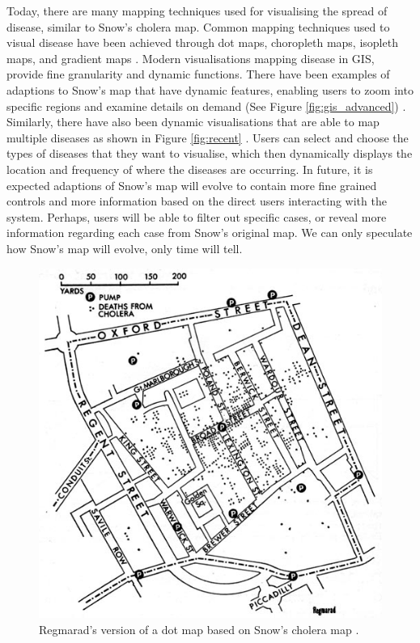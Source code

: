 \documentclass[12pt]{article}
\begin{document}
Today, there are many mapping techniques used for visualising the spread of disease, similar to Snow's cholera map. Common mapping techniques used to visual disease have been achieved through dot maps, choropleth maps, isopleth maps, and gradient maps \cite{recent}. Modern visualisations mapping disease in GIS, provide fine granularity and dynamic functions. There have been examples of adaptions to Snow's map that have dynamic features, enabling users to zoom into specific regions and examine details on demand (See Figure \ref{fig:gis_advanced}) \cite{advanced}. Similarly, there have also been dynamic visualisations that are able to map multiple diseases as shown in Figure \ref{fig:recent} \cite{recent}. Users can select and choose the types of diseases that they want to visualise, which then dynamically displays the location and frequency of where the diseases are occurring. In future, it is expected adaptions of Snow's map will evolve to contain more fine grained controls and more information based on the direct users interacting with the system. Perhaps, users will be able to filter out specific cases, or reveal more information regarding each case from Snow's original map. We can only speculate how Snow's map will evolve, only time will tell. 

\begin{figure}
\centering
\includegraphics[scale=15.0]{snowmap1_regmarad}
\caption{Regmarad's version of a dot map based on Snow's cholera map \cite{ralph}.
}
\label{fig:reg}
\end{figure}
\end{document}
